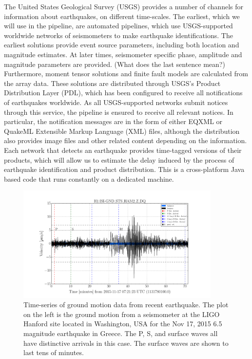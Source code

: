 \documentclass[reprint, prl, aps, showpacs]{revtex4-1}
\newcommand{\rednote}[1]{{\color{red} (#1)}}
\begin{document}
The United States Geological Survey (USGS) provides a number of channels for information about earthquakes, on different time-scales. The earliest, which we will use in the pipeline, are automated pipelines, which use USGS-supported worldwide networks of seismometers to make earthquake identifications. The earliest solutions provide event source parameters, including both location and magnitude estimates. At later times, seismometer specific phase, amplitude and magnitude parameters are provided. \rednote{What does the last sentence mean?} Furthermore, moment tensor solutions and finite fault models are calculated from the array data. These solutions are distributed through USGS's Product Distribution Layer (PDL), which has been configured to receive all notifications of earthquakes worldwide. As all USGS-supported networks submit notices through this service, the pipeline is ensured to receive all relevant notices.
In particular, the notification messages are in the form of either EQXML or QuakeML Extensible Markup Language (XML) files, although the distribution also provides image files and other related content depending on the information. Each network that detects an earthquake provides time-tagged versions of their products, which will allow us to estimate the delay induced by the process of earthquake identification and product distribution. This is a cross-platform Java based code that runs constantly on a dedicated machine. 

\begin{figure}[t]
\hspace*{-0.5cm}
\centering
\includegraphics[width=4in]{timeseries.pdf}
\caption{Time-series of ground motion data from recent earthquake. The plot on the left is the ground motion from a seismometer at the LIGO Hanford site located in Washington, USA for the Nov 17, 2015 6.5 magnitude earthquake in Greece. The P, S, and surface waves all have distinctive arrivals in this case. The surface waves are shown to last tens of minutes.}
 \label{fig:timeseries}
 \end{figure}
\end{document}
